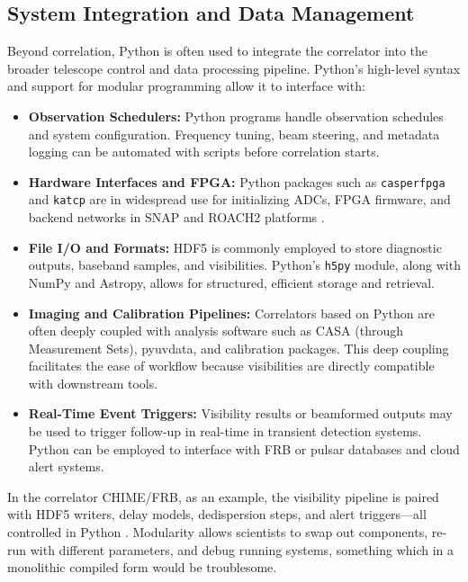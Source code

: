     \subsection{System Integration and Data Management}
    Beyond correlation, Python is often used to integrate the correlator into the broader telescope control and data processing pipeline. Python’s high-level syntax and support for modular programming allow it to interface with:

   \begin{itemize}
        \item \textbf{Observation Schedulers:} Python programs handle observation schedules and system configuration. Frequency tuning, beam steering, and metadata logging can be automated with scripts before correlation starts.
        
        \item \textbf{Hardware Interfaces and FPGA:} Python packages such as \texttt{casperfpga} and \texttt{katcp} are in widespread use for initializing ADCs, FPGA firmware, and backend networks in SNAP and ROACH2 platforms \cite{Gorthi2021}.
        
        \item \textbf{File I/O and Formats:} HDF5 is commonly employed to store diagnostic outputs, baseband samples, and visibilities. Python's \texttt{h5py} module, along with NumPy and Astropy, allows for structured, efficient storage and retrieval.
        
        \item \textbf{Imaging and Calibration Pipelines:} Correlators based on Python are often deeply coupled with analysis software such as CASA (through Measurement Sets), pyuvdata, and calibration packages. This deep coupling facilitates the ease of workflow because visibilities are directly compatible with downstream tools.
        
        \item \textbf{Real-Time Event Triggers:} Visibility results or beamformed outputs may be used to trigger follow-up in real-time in transient detection systems. Python can be employed to interface with FRB or pulsar databases and cloud alert systems.
    \end{itemize}

    In the correlator CHIME/FRB, as an example, the visibility pipeline is paired with HDF5 writers, delay models, dedispersion steps, and alert triggers—all controlled in Python \cite{Leung2024}. Modularity allows scientists to swap out components, re-run with different parameters, and debug running systems, something which in a monolithic compiled form would be troublesome.

